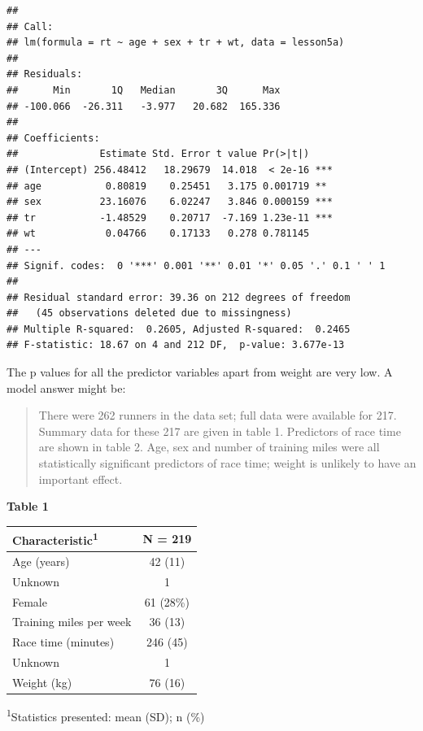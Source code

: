 \documentclass[]{book}
\begin{document}
\begin{verbatim}
## 
## Call:
## lm(formula = rt ~ age + sex + tr + wt, data = lesson5a)
## 
## Residuals:
##      Min       1Q   Median       3Q      Max 
## -100.066  -26.311   -3.977   20.682  165.336 
## 
## Coefficients:
##              Estimate Std. Error t value Pr(>|t|)    
## (Intercept) 256.48412   18.29679  14.018  < 2e-16 ***
## age           0.80819    0.25451   3.175 0.001719 ** 
## sex          23.16076    6.02247   3.846 0.000159 ***
## tr           -1.48529    0.20717  -7.169 1.23e-11 ***
## wt            0.04766    0.17133   0.278 0.781145    
## ---
## Signif. codes:  0 '***' 0.001 '**' 0.01 '*' 0.05 '.' 0.1 ' ' 1
## 
## Residual standard error: 39.36 on 212 degrees of freedom
##   (45 observations deleted due to missingness)
## Multiple R-squared:  0.2605, Adjusted R-squared:  0.2465 
## F-statistic: 18.67 on 4 and 212 DF,  p-value: 3.677e-13
\end{verbatim}

The p values for all the predictor variables apart from weight are very
low. A model answer might be:

\begin{quote}
There were 262 runners in the data set; full data were available for
217. Summary data for these 217 are given in table 1. Predictors of race
time are shown in table 2. Age, sex and number of training miles were
all statistically significant predictors of race time; weight is
unlikely to have an important effect.
\end{quote}

\textbf{Table 1}

\captionsetup[table]{labelformat=empty,skip=1pt}
\begin{longtable}{lc}
\toprule
\textbf{Characteristic}\textsuperscript{1} & \textbf{N = 219} \\ 
\midrule
Age (years) & 42 (11) \\ 
Unknown & 1 \\ 
Female & 61 (28\%) \\ 
Training miles per week & 36 (13) \\ 
Race time (minutes) & 246 (45) \\ 
Unknown & 1 \\ 
Weight (kg) & 76 (16) \\ 
\bottomrule
\end{longtable}
\vspace{-5mm}
\begin{minipage}{\linewidth}
\textsuperscript{1}Statistics presented: mean (SD); n (\%) \\ 
\end{minipage}
\end{document}

